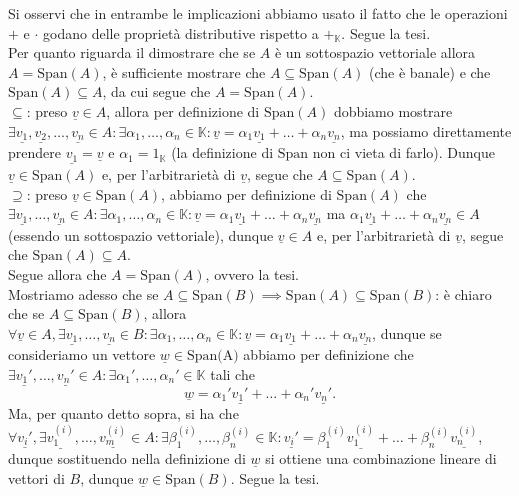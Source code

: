 Si osservi che in entrambe le implicazioni abbiamo usato il fatto che le operazioni $+$ e $\cdot$ godano delle proprietà distributive rispetto a $+_\mathbb{K}$. Segue la tesi. \\
Per quanto riguarda il dimostrare che se $A$ è un sottospazio vettoriale allora $A = \text{Span}(A)$, è sufficiente mostrare che $A \subseteq \text{Span}(A)$ (che è banale) e che $\text{Span}(A) \subseteq A$, da cui segue che $A = \text{Span}(A)$. \\
$\boxed{\subseteq}$: preso $\underline{v} \in A$, allora per definizione di $\text{Span}(A)$ dobbiamo mostrare $\exists \underline{v_1}, \underline{v_2}, \ldots, \underline{v_n} \in A : \exists \alpha_1, \ldots, \alpha_n \in \mathbb{K} : \underline{v} = \alpha_1 \underline{v_1} + \ldots + \alpha_n \underline{v_n}$, ma possiamo direttamente prendere $\underline{v_1} = \underline{v}$ e $\alpha_1 = 1_\mathbb{K}$ (la definizione di $\text{Span}$ non ci vieta di farlo). Dunque $\underline{v} \in \text{Span}(A)$ e, per l'arbitrarietà di $\underline{v}$, segue che $A \subseteq \text{Span}(A)$. \\
$\boxed{\supseteq}$: preso $\underline{v} \in \text{Span}(A)$, abbiamo per definizione di $\text{Span}(A)$ che $\exists \underline{v_1}, \ldots, \underline{v_n} \in A : \exists \alpha_1, \ldots, \alpha_n \in \mathbb{K} : \underline{v} = \alpha_1 \underline{v_1} + \ldots + \alpha_n \underline{v_n}$ ma $\alpha_1 \underline{v_1} + \ldots + \alpha_n \underline{v_n} \in A$ (essendo un sottospazio vettoriale), dunque $\underline{v} \in A$ e, per l'arbitrarietà di $\underline{v}$, segue che $\text{Span}(A) \subseteq A$. \\
Segue allora che $A = \text{Span}(A)$, ovvero la tesi. \\
Mostriamo adesso che se $A \subseteq \text{Span}(B) \implies \text{Span}(A) \subseteq \text{Span}(B)$: è chiaro che se $A \subseteq \text{Span}(B)$, allora $\forall \underline{v} \in A, \exists \underline{v_1}, \ldots, \underline{v_n} \in B : \exists \alpha_1, \ldots, \alpha_n \in \mathbb{K} : \underline{v} = \alpha_1 \underline{v_1} + \ldots + \alpha_n \underline{v_n}$, dunque se consideriamo un vettore $\underline{w} \in \text{Span(A)}$ abbiamo per definizione che $\exists \underline{v_1'}, \ldots, \underline{v_n'} \in A : \exists \alpha_1', \ldots, \alpha_n' \in \mathbb{K}$ tali che
$$
    \underline{w} = \alpha_1' \underline{v_1'} + \ldots + \alpha_n' \underline{v_n'}.
$$
Ma, per quanto detto sopra, si ha che $\forall \underline{v_i'}, \exists \underline{v^{(i)}_1}, \ldots, \underline{v^{(i)}_m} \in A : \exists \beta^{(i)}_1, \ldots, \beta^{(i)}_n \in \mathbb{K} : \underline{v_i'} = \beta^{(i)}_1 \underline{v^{(i)}_1} + \ldots + \beta^{(i)}_n \underline{v^{(i)}_n}$, dunque sostituendo nella definizione di $\underline{w}$ si ottiene una combinazione lineare di vettori di $B$, dunque $\underline{w} \in \text{Span}(B)$. Segue la tesi. \\
